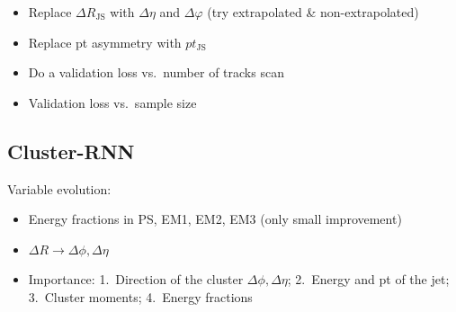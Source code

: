 \begin{itemize}
\item Replace $\Delta R_\mathrm{JS}$ with $\Delta \eta$ and $\Delta \varphi$
  (try extrapolated \& non-extrapolated)
\item Replace pt asymmetry with $pt_\mathrm{JS}$
\item Do a validation loss vs.\ number of tracks scan
\item Validation loss vs.\ sample size
\end{itemize}

\subsection{Cluster-RNN}
\label{sec:rnn_clusters}


Variable evolution:
\begin{itemize}
\item Energy fractions in PS, EM1, EM2, EM3 (only small improvement)
\item $\Delta R \rightarrow \Delta \phi, \Delta \eta$
\item Importance: 1.\ Direction of the cluster $\Delta \phi, \Delta \eta$; 2.\
  Energy and pt of the jet; 3.\ Cluster moments; 4.\ Energy fractions
\end{itemize}

